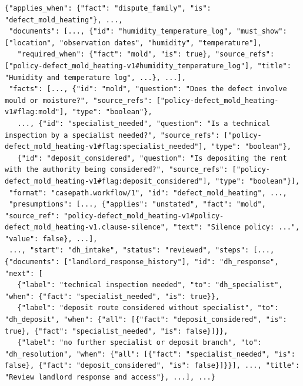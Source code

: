 \begin{lstlisting}[title={\textbf{Tenancy defect workflow} (\texttt{defect\_mold\_heating.json}, excerpt)}]
{"applies_when": {"fact": "dispute_family", "is": "defect_mold_heating"}, ...,
 "documents": [..., {"id": "humidity_temperature_log", "must_show": ["location", "observation dates", "humidity", "temperature"],
   "required_when": {"fact": "mold", "is": true}, "source_refs": ["policy-defect_mold_heating-v1#humidity_temperature_log"], "title": "Humidity and temperature log", ...}, ...],
 "facts": [..., {"id": "mold", "question": "Does the defect involve mould or moisture?", "source_refs": ["policy-defect_mold_heating-v1#flag:mold"], "type": "boolean"},
   ..., {"id": "specialist_needed", "question": "Is a technical inspection by a specialist needed?", "source_refs": ["policy-defect_mold_heating-v1#flag:specialist_needed"], "type": "boolean"},
   {"id": "deposit_considered", "question": "Is depositing the rent with the authority being considered?", "source_refs": ["policy-defect_mold_heating-v1#flag:deposit_considered"], "type": "boolean"}],
 "format": "casepath.workflow/1", "id": "defect_mold_heating", ...,
 "presumptions": [..., {"applies": "unstated", "fact": "mold", "source_ref": "policy-defect_mold_heating-v1#policy-defect_mold_heating-v1.clause-silence", "text": "Silence policy: ...", "value": false}, ...],
 ..., "start": "dh_intake", "status": "reviewed", "steps": [..., {"documents": ["landlord_response_history"], "id": "dh_response", "next": [
   {"label": "technical inspection needed", "to": "dh_specialist", "when": {"fact": "specialist_needed", "is": true}},
   {"label": "deposit route considered without specialist", "to": "dh_deposit", "when": {"all": [{"fact": "deposit_considered", "is": true}, {"fact": "specialist_needed", "is": false}]}},
   {"label": "no further specialist or deposit branch", "to": "dh_resolution", "when": {"all": [{"fact": "specialist_needed", "is": false}, {"fact": "deposit_considered", "is": false}]}}], ..., "title": "Review landlord response and access"}, ...], ...}
\end{lstlisting}

